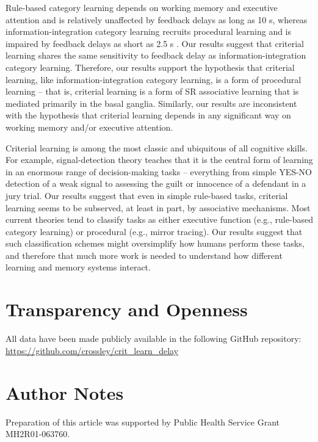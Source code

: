 \documentclass[doc, floatsintext]{apa7}
\begin{document}
Rule-based category learning depends on working memory and
executive attention and is relatively unaffected by feedback
delays as long as 10 s, whereas information-integration
category learning recruits procedural learning and is
impaired by feedback delays as short as 2.5 s \parencite[for
a review of the scores of studies supporting this
hypothesis, see, e.g.,][]{Ashby2025}. Our results suggest
that criterial learning shares the same sensitivity to
feedback delay as information-integration category learning.
Therefore, our results support the hypothesis that criterial
learning, like information-integration category learning, is
a form of procedural learning -- that is, criterial learning
is a form of SR associative learning that is mediated
primarily in the basal ganglia. Similarly, our results are
inconsistent with the hypothesis that criterial learning
depends in any significant way on working memory and/or
executive attention. 

Criterial learning is among the most classic and ubiquitous
of all cognitive skills. For example, signal-detection
theory teaches that it is the central form of learning in an
enormous range of decision-making tasks -- everything from
simple YES-NO detection of a weak signal to assessing the
guilt or innocence of a defendant in a jury trial. Our
results suggest that even in simple rule-based tasks,
criterial learning seems to be subserved, at least in part,
by associative mechanisms. Most current theories tend to
classify tasks as either executive function (e.g.,
rule-based category learning) or procedural (e.g., mirror
tracing). Our results suggest that such classification
schemes might oversimplify how humans perform these tasks,
and therefore that much more work is needed to understand
how different learning and memory systems interact.

\section{Transparency and Openness}
All data have been made publicly available in the following
GitHub repository:
\url{https://github.com/crossley/crit_learn_delay}

\section{Author Notes}
Preparation of this article was supported by Public Health
Service Grant MH2R01-063760.

\printbibliography
\end{document}
